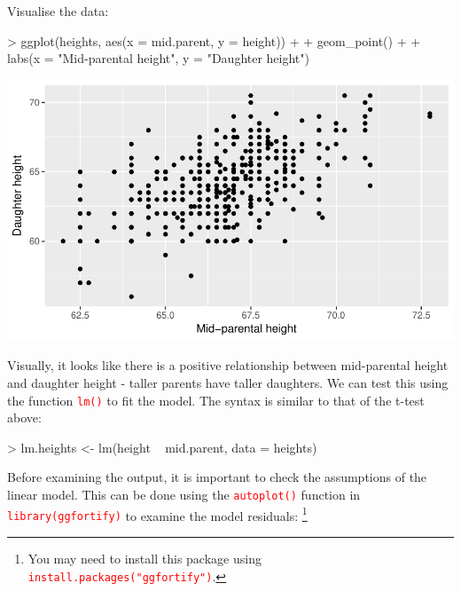 \documentclass[a4paper,12pt]{article}
\newcommand\code[1]{\textcolor{red}{\texttt{#1}}}
\begin{document}
Visualise the data:

\begin{shaded}
\begin{Schunk}
\begin{Sinput}
> ggplot(heights, aes(x = mid.parent, y = height)) + 
+   geom_point() +
+   labs(x = "Mid-parental height", y = "Daughter height")
\end{Sinput}
\end{Schunk}
\includegraphics{1_Stats_Course_Notes-knitr-018}
\end{shaded}

Visually, it looks like there is a positive relationship between mid-parental height and daughter height - taller parents have taller daughters. We can test this using the function \code{lm()} to fit the model. The syntax is similar to that of the t-test above:

\begin{shaded}
\begin{Schunk}
\begin{Sinput}
> lm.heights <- lm(height ~ mid.parent, data = heights)
\end{Sinput}
\end{Schunk}
\end{shaded}

Before examining the output, it is important to check the assumptions of the linear model. This can be done using the \code{autoplot()} function in \code{library(ggfortify)} to examine the model residuals: \footnote{You may need to install this package using \code{install.packages("ggfortify")}.} \\
\end{document}
